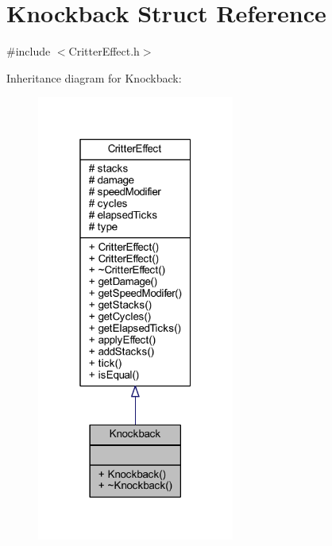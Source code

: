 \hypertarget{struct_knockback}{\section{Knockback Struct Reference}
\label{struct_knockback}
}


{\ttfamily \#include $<$Critter\+Effect.\+h$>$}



Inheritance diagram for Knockback\+:
\nopagebreak
\begin{figure}[H]
\begin{center}
\leavevmode
\includegraphics[width=184pt]{struct_knockback__inherit__graph}
\end{center}
\end{figure}


